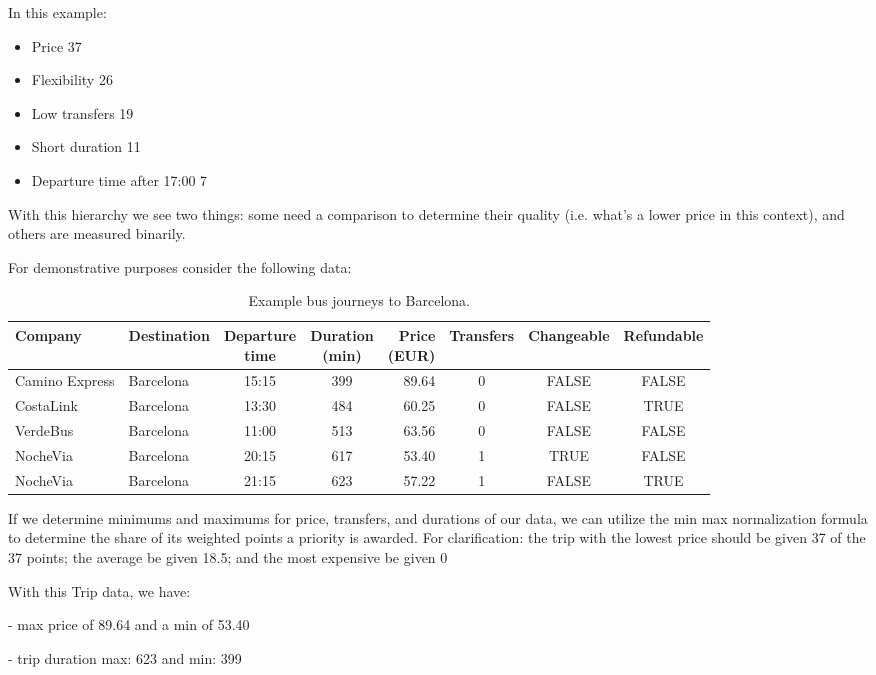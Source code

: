 ﻿\documentclass[11pt]{article}
\begin{document}
In this example:
\begin{itemize}
  \item Price 37
  \item Flexibility 26
  \item Low transfers 19
  \item Short duration 11
  \item Departure time after 17:00 7
\end{itemize}
With this hierarchy we see two things: some need a comparison to determine their quality (i.e. what's a lower price in this context), and others are measured binarily.

For demonstrative purposes consider the following data:
\begin{table}[H]
\centering
\scriptsize
\setlength{\tabcolsep}{3pt}
\begin{tabular}{llccrccc}
\toprule
Company & Destination & \shortstack{Departure\\time}
& \shortstack{Duration\\(min)} & \shortstack{Price\\(EUR)}
& Transfers & Changeable & Refundable \\
\midrule
Camino Express & Barcelona & 15:15 & 399 & 89.64 & 0 & FALSE & FALSE \\
CostaLink & Barcelona & 13:30 & 484 & 60.25 & 0 & FALSE & TRUE \\
VerdeBus & Barcelona & 11:00 & 513 & 63.56 & 0 & FALSE & FALSE \\
NocheVia & Barcelona & 20:15 & 617 & 53.40 & 1 & TRUE & FALSE \\
NocheVia & Barcelona & 21:15 & 623 & 57.22 & 1 & FALSE & TRUE \\
\bottomrule
\end{tabular}
\caption{Example bus journeys to Barcelona.}
\label{tab:barcelona-trips}
\end{table}

If we determine minimums and maximums for price, transfers, and durations of our data, we can utilize the min max normalization formula to determine the share of its weighted points a priority is awarded.
For clarification: the trip with the lowest price should be given 37 of the 37 points; the average be given 18.5; and the most expensive be given 0

With this Trip data, we have:

- max price of 89.64 and a min of 53.40

- trip duration max: 623 and min: 399
\end{document}
